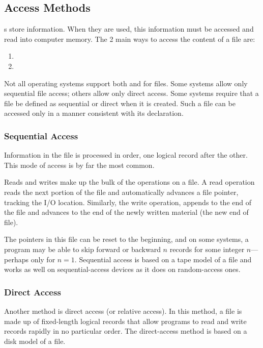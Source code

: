 \subsection{Access Methods}\label{subsec:Access_Methods}
s store information.
When they are used, this information must be accessed and read into computer memory.
The 2 main ways to access the content of a file are:
\begin{enumerate}[noitemsep]
\item {}
\item {}
\end{enumerate}

Not all operating systems support both  and  for files.
Some systems allow only sequential file access; others allow only direct access.
Some systems require that a file be defined as sequential or direct when it is created.
Such a file can be accessed only in a manner consistent with its declaration.

\subsubsection{Sequential Access}\label{subsubsec:Sequential_Access}
Information in the file is processed in order, one logical record after the other.
This mode of access is by far the most common.

Reads and writes make up the bulk of the operations on a file.
A read operation reads the next portion of the file and automatically advances a file pointer, tracking the I/O location.
Similarly, the write operation, appends to the end of the file and advances to the end of the newly written material (the new end of file).

The pointers in this file can be reset to the beginning, and on some systems, a program may be able to skip forward or backward $n$ records for some integer $n$—perhaps only for $n = 1$.
Sequential access is based on a tape model of a file and works as well on sequential-access devices as it does on random-access ones.

\subsubsection{Direct Access}\label{subsubsec:Direct_Access}
Another method is direct access (or relative access).
In this method, a file is made up of fixed-length logical records that allow programs to read and write records rapidly in no particular order.
The direct-access method is based on a disk model of a file.


